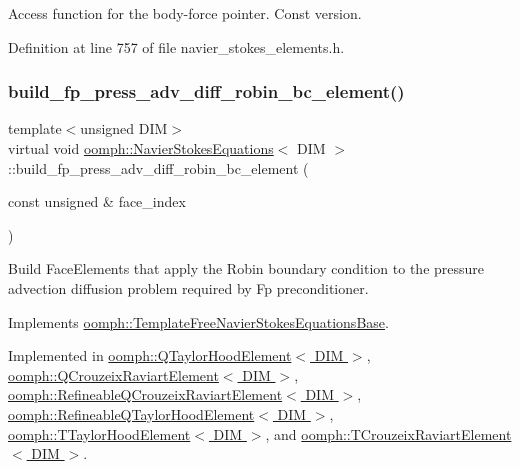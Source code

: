 Access function for the body-\/force pointer. Const version. 



Definition at line 757 of file navier\+\_\+stokes\+\_\+elements.\+h.

\mbox{\label{classoomph_1_1NavierStokesEquations_a16bfab3df70ad2204217590c0e3b7de1}} 
\subsubsection{\texorpdfstring{build\+\_\+fp\+\_\+press\+\_\+adv\+\_\+diff\+\_\+robin\+\_\+bc\+\_\+element()}{build\_fp\_press\_adv\_diff\_robin\_bc\_element()}}
{\footnotesize\ttfamily template$<$unsigned D\+IM$>$ \\
virtual void \hyperlink{classoomph_1_1NavierStokesEquations}{oomph\+::\+Navier\+Stokes\+Equations}$<$ D\+IM $>$\+::build\+\_\+fp\+\_\+press\+\_\+adv\+\_\+diff\+\_\+robin\+\_\+bc\+\_\+element (\begin{DoxyParamCaption}\item[{const unsigned \&}]{face\+\_\+index }\end{DoxyParamCaption})\hspace{0.3cm}{\ttfamily [pure virtual]}}



Build Face\+Elements that apply the Robin boundary condition to the pressure advection diffusion problem required by Fp preconditioner. 



Implements \hyperlink{classoomph_1_1TemplateFreeNavierStokesEquationsBase_a8e896ce593f2dad7d21fade4afabe2c4}{oomph\+::\+Template\+Free\+Navier\+Stokes\+Equations\+Base}.



Implemented in \hyperlink{classoomph_1_1QTaylorHoodElement_aa3c4eabbedadb47c3bcbbbe22febf3cf}{oomph\+::\+Q\+Taylor\+Hood\+Element$<$ D\+I\+M $>$}, \hyperlink{classoomph_1_1QCrouzeixRaviartElement_a5b824083683ead3f8bead4061bce21f1}{oomph\+::\+Q\+Crouzeix\+Raviart\+Element$<$ D\+I\+M $>$}, \hyperlink{classoomph_1_1RefineableQCrouzeixRaviartElement_a734c84a54196ba141791e7471d7c3c7d}{oomph\+::\+Refineable\+Q\+Crouzeix\+Raviart\+Element$<$ D\+I\+M $>$}, \hyperlink{classoomph_1_1RefineableQTaylorHoodElement_ab7f69a90be6e5129d2dbf294e01642af}{oomph\+::\+Refineable\+Q\+Taylor\+Hood\+Element$<$ D\+I\+M $>$}, \hyperlink{classoomph_1_1TTaylorHoodElement_a3ed1ee43804db6acde4aa996a0e878c0}{oomph\+::\+T\+Taylor\+Hood\+Element$<$ D\+I\+M $>$}, and \hyperlink{classoomph_1_1TCrouzeixRaviartElement_ad99c365335e965607273f133d8739ae2}{oomph\+::\+T\+Crouzeix\+Raviart\+Element$<$ D\+I\+M $>$}.

